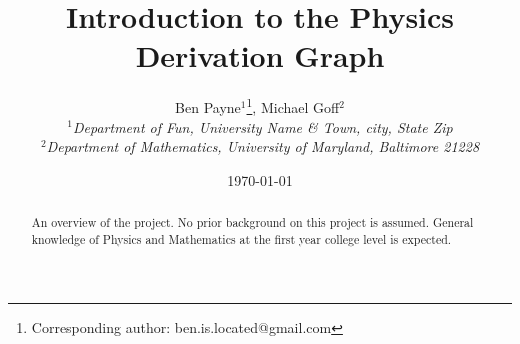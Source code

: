 \documentclass{article}
\newcommand{\pdg}{Physics Derivation Graph}
\begin{document}
\title{Introduction to the \pdg}

\author{Ben Payne$^{1}$\footnote{Corresponding author: ben.is.located@gmail.com}, Michael Goff$^{2}$\\
{\it $^{1}$Department of Fun, University Name \& Town, city, State Zip}\\
{\it $^{2}$Department of Mathematics, University of Maryland, Baltimore 21228}}

\date{\today}

\maketitle %
\begin{abstract}
An overview of the project. No prior background on this project is assumed. General knowledge of Physics and Mathematics at the first year college level is expected.
\end{abstract}
\end{document}
